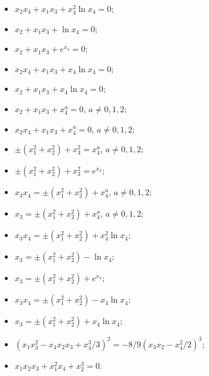 \begin{thm}
\begin{itemize}
\item[$(16)$] $x_2x_4+x_1x_3+ x_4^2\ln x_4=0;$ 


\item[$(17)$] $x_2+x_1x_3+\ln x_4=0;$


\item[$(18)$] $x_2+x_1x_3+e^{ x_4}=0;$


\item[$(19)$] $x_2x_4+x_1x_3+ x_4\ln x_4=0;$ 


\item[$(20)$] $x_2+x_1x_3+x_4\ln x_4=0;$


\item[$(21)$] $x_2+x_1x_3+ x_4^{a}=0$, $a\ne 0,1,2;$


\item[$(22)$] $x_2x_4+x_1x_3+ x_4^{a}=0$, $a\ne 0,1,2;$


\item[$(23)$] $\pm(x_1^2+x_2^2)+x_3^2=x_4^{a}$, $a\ne 0,1,2;$


\item[$(24)$] $\pm(x_1^2+x_2^2)+x_3^2=e^{x_4};$


\item[$(25)$] $x_3x_4=\pm(x_1^2+x_2^2)+x_4^{a}$, $a\ne 0,1,2;$


\item[$(26)$] $x_3=\pm(x_1^2+x_2^2)+x_4^{a}$, $a\ne 0,1,2;$


\item[$(27)$] $x_3x_4=\pm(x_1^2+x_2^2)+x_4^2\ln x_4;$ 


\item[$(28)$] $x_3=\pm(x_1^2+x_2^2)-\ln x_4;$ 


\item[$(29)$] $x_3=\pm(x_1^2+x_2^2)+e^{ x_4};$


\item[$(30)$] $x_3x_4=\pm(x_1^2+x_2^2)-x_4\ln x_4;$ 


\item[$(31)$] $x_3=\pm(x_1^2+x_2^2)+x_4\ln x_4;$


\item[$(32)$] $(x_1x_3^2-x_4x_2x_3+x_4^3/3)^2=-8/9(x_3x_2-x_4^2/2)^3;$


\item[$(33)$] $x_1x_2x_3+x_1^2x_4+x_2^3=0$.


\end{itemize}


\end{thm}






